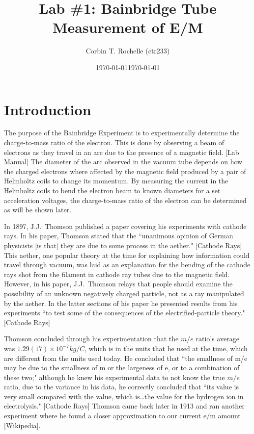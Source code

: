 \documentclass[aps,prl,10pt,twocolumn,floatfix]{revtex4-2}
\begin{document}
\begin{abstract}
\end{abstract}


\title{Lab \#1: Bainbridge Tube Measurement of E/M}
\author{Corbin T. Rochelle (ctr233)}
\date{\today}
\date{\today}

\maketitle

\section{Introduction}\label{Intro}

The purpose of the Bainbridge Experiment is to experimentally determine the charge-to-mass ratio of the electron.
This is done by observing a beam of electrons as they travel in an arc due to the presence of a magnetic field. [Lab Manual]
The diameter of the arc observed in the vacuum tube depends on how the charged electrons where affected by the magnetic field produced by a pair of Helmholtz coils to change its momentum.
By measuring the current in the Helmholtz coils to bend the electron beam to known diameters for a set acceleration voltages, the charge-to-mass ratio of the electron can be determined as will be shown later.

In 1897, J.J.~Thomson published a paper covering his experiments with cathode rays. 
In his paper, Thomson stated that the ``unanimous opinion of German physicists [is that] they are due to some process in the aether." [Cathode Rays]
This aether, one popular theory at the time for explaining how information could travel through vacuum, was laid as an explanation for the bending of the cathode rays shot from the filament in cathode ray tubes due to the magnetic field.
However, in his paper, J.J.~Thomson relays that people should examine the possibility of an unknown negatively charged particle, not as a ray manipulated by the aether.
In the latter sections of his paper he presented results from his experiments ``to test some of the consequences of the electrified-particle theory." [Cathode Rays]

Thomson concluded through his experimentation that the $m/e$ ratio's average was  $1.29(17)\!\times\!10^{-7} kg/C$, which is in the units that he used at the time, which are different from the units used today.
He concluded that ``the smallness of m/e may be due to the smallness of m or the largeness of e, or to a combination
of these two;"
although he knew his experimental data to not know the true $m/e$ ratio, due to the variance in his data, he correctly concluded that ``its value is very small compared with the value, which is\ldots the value for the hydrogen ion in electrolysis." [Cathode Rays]
Thomson came back later in 1913 and ran another experiment where he found a closer approximation to our current e/m amount [Wikipedia].
\end{document}
